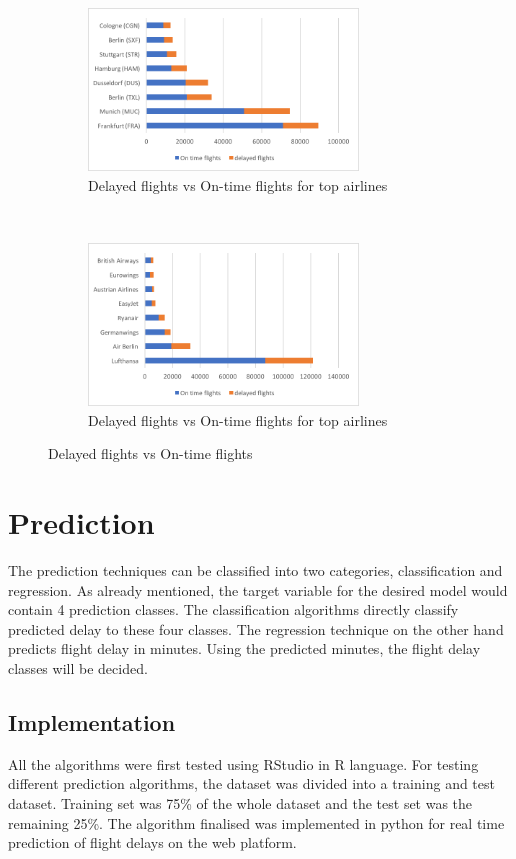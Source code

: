 \begin{figure}[h]
    \centering
    \begin{subfigure}[h]{0.5\textwidth}
        \centering
        \includegraphics[height=1.7in]{Figures/airport_delay_ratio.png}
        \caption{Delayed flights vs On-time flights for top airlines}
    \end{subfigure}%
    ~ 
    \begin{subfigure}[h]{0.5\textwidth}
        \centering
        \includegraphics[height=1.7in]{Figures/airline_delay_ratio.png}
        \caption{Delayed flights vs On-time flights for top airlines}
    \end{subfigure}
    \caption{Delayed flights vs On-time flights}
\end{figure}


\section{Prediction}
The prediction techniques can be classified into two categories, classification and regression. As already mentioned, the target variable for the desired model would contain 4 prediction classes. The classification algorithms directly classify predicted delay to these four classes. The regression technique on the other hand predicts flight delay in minutes. Using the predicted minutes, the flight delay classes will be decided.

\subsection{Implementation}
All the algorithms were first tested using RStudio in R language. For testing different prediction algorithms, the dataset was divided into a training and test dataset. Training set was 75\% of the whole dataset and the test set was the remaining 25\%. The algorithm finalised was implemented in python for real time prediction of flight delays on the web platform.

